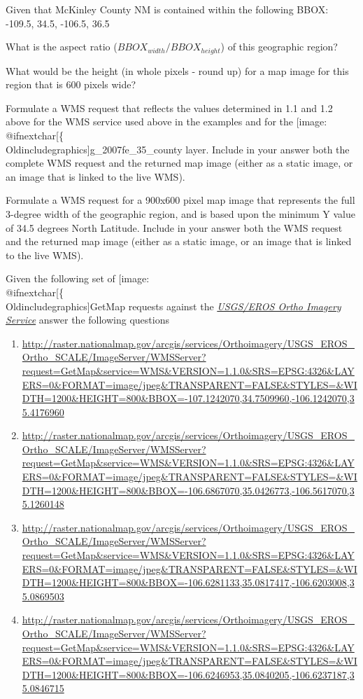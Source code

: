 \documentclass[]{book}
\makeatletter
\providecommand{\tightlist}{%
  \setlength{\itemsep}{0pt}\setlength{\parskip}{0pt}}
\def\ScaleIfNeeded{%
  \ifdim\Gin@nat@width>.5\linewidth
    .5\linewidth
  \else
    \Gin@nat@width
  \fi
}
\let\Oldincludegraphics\texttt{[image: \%
 \\catcode`\\@=11\\relax\%
 \%\\gdef\\includegraphics\{\\@ifnextchar[\{\\Oldincludegraphics]}{\Oldincludegraphics[width=\ScaleIfNeeded]}}%
\gdef\texttt{[image: \\@ifnextchar[\{\\Oldincludegraphics]}{\Oldincludegraphics[max size={.75\textwidth}{.75\textheight}]}}%
\makeatother
\begin{document}
Given that McKinley County NM is contained within the following BBOX:
-109.5, 34.5, -106.5, 36.5

\begin{description}
\tightlist
\item[Question 1]
What is the aspect ratio (\(BBOX_{width}/BBOX_{height}\)) of this
geographic region?
\item[Question 2]
What would be the height (in whole pixels - round up) for a map image
for this region that is 600 pixels wide?
\item[Question 3]
Formulate a WMS request that reflects the values determined in 1.1 and
1.2 above for the WMS service used above in the examples and for the
\texttt{g\_2007fe\_35\_county} layer. Include in your answer both the
complete WMS request and the returned map image (either as a static
image, or an image that is linked to the live WMS).
\item[Question 4]
Formulate a WMS request for a 900x600 pixel map image that represents
the full 3-degree width of the geographic region, and is based upon the
minimum Y value of 34.5 degrees North Latitude. Include in your answer
both the WMS request and the returned map image (either as a static
image, or an image that is linked to the live WMS).
\end{description}

Given the following set of \texttt{GetMap} requests against the
\emph{\href{http://raster.nationalmap.gov/arcgis/rest/services/Orthoimagery/USGS_EROS_Ortho_SCALE/ImageServer}{USGS/EROS
Ortho Imagery Service}} answer the following questions

\begin{enumerate}
\def\labelenumi{\arabic{enumi})}
\item
  \url{http://raster.nationalmap.gov/arcgis/services/Orthoimagery/USGS_EROS_Ortho_SCALE/ImageServer/WMSServer?request=GetMap\&service=WMS\&VERSION=1.1.0\&SRS=EPSG:4326\&LAYERS=0\&FORMAT=image/jpeg\&TRANSPARENT=FALSE\&STYLES=\&WIDTH=1200\&HEIGHT=800\&BBOX=-107.1242070,34.7509960,-106.1242070,35.4176960}
\item
  \url{http://raster.nationalmap.gov/arcgis/services/Orthoimagery/USGS_EROS_Ortho_SCALE/ImageServer/WMSServer?request=GetMap\&service=WMS\&VERSION=1.1.0\&SRS=EPSG:4326\&LAYERS=0\&FORMAT=image/jpeg\&TRANSPARENT=FALSE\&STYLES=\&WIDTH=1200\&HEIGHT=800\&BBOX=-106.6867070,35.0426773,-106.5617070,35.1260148}
\item
  \url{http://raster.nationalmap.gov/arcgis/services/Orthoimagery/USGS_EROS_Ortho_SCALE/ImageServer/WMSServer?request=GetMap\&service=WMS\&VERSION=1.1.0\&SRS=EPSG:4326\&LAYERS=0\&FORMAT=image/jpeg\&TRANSPARENT=FALSE\&STYLES=\&WIDTH=1200\&HEIGHT=800\&BBOX=-106.6281133,35.0817417,-106.6203008,35.0869503}
\item
  \url{http://raster.nationalmap.gov/arcgis/services/Orthoimagery/USGS_EROS_Ortho_SCALE/ImageServer/WMSServer?request=GetMap\&service=WMS\&VERSION=1.1.0\&SRS=EPSG:4326\&LAYERS=0\&FORMAT=image/jpeg\&TRANSPARENT=FALSE\&STYLES=\&WIDTH=1200\&HEIGHT=800\&BBOX=-106.6246953,35.0840205,-106.6237187,35.0846715}
\end{enumerate}
\end{document}
